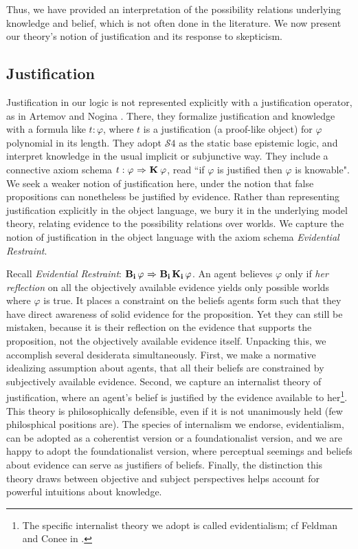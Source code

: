  Thus, we have provided an interpretation of the possibility relations underlying knowledge and belief, which is not often done in the literature. We now present our theory's notion of justification and its response to skepticism.
 
 \subsection{Justification}\label{sec:just}
 Justification in our logic is not represented explicitly with a justification operator, as in Artemov and Nogina \cite{ArtemovNogina}. There, they formalize justification and knowledge with a formula like $t:\varphi$, where $t$ is a justification (a proof-like object) for $\varphi$ polynomial in its length. They adopt $\mathcal{S}4$ as the static base epistemic logic, and interpret knowledge in the usual implicit or subjunctive way. They include a connective axiom schema $t:\varphi {\ \Rightarrow \ } \mathbf{K}_{\mathbf{}}\,\varphi$, read ``if $\varphi$ is justified then $\varphi$ is knowable". We seek a weaker notion of justification here, under the notion that false propositions can nonetheless be justified by evidence. Rather than representing justification explicitly in the object language, we bury it in the underlying model theory, relating evidence to the possibility relations over worlds. We capture the notion of justification in the object language with the axiom schema \emph{Evidential Restraint}.
 
Recall \emph{Evidential Restraint}: $\mathbf{B}_{\mathbf{i}}\,\varphi {\ \Rightarrow \ } \mathbf{B}_{\mathbf{i}}\,\mathbf{K}_{\mathbf{i}}\,\varphi$. An agent believes $\varphi$ only if \emph{her reflection} on all the objectively available evidence yields only possible worlds where $\varphi$ is true. It places a constraint on the beliefs agents form such that they have direct awareness of solid evidence for the proposition. Yet they can still be mistaken, because it is their reflection on the evidence that supports the proposition, not the objectively available evidence itself. Unpacking this, we accomplish several desiderata simultaneously. First, we make a normative idealizing assumption about agents, that all their beliefs are constrained by subjectively available evidence. Second, we capture an internalist theory of justification, where an agent's belief is justified by the evidence available to her\footnote{The specific internalist theory we adopt is called evidentialism; cf Feldman and Conee in \cite{evidentialism}.}. This theory is philosophically defensible, even if it is not unanimously held (few philosphical positions are). The species of internalism we endorse, evidentialism, can be adopted as a coherentist version or a foundationalist version, and we are happy to adopt the foundationalist version, where perceptual seemings and beliefs about evidence can serve as justifiers of beliefs. Finally, the distinction this theory draws between objective and subject perspectives helps account for powerful intuitions about knowledge.

